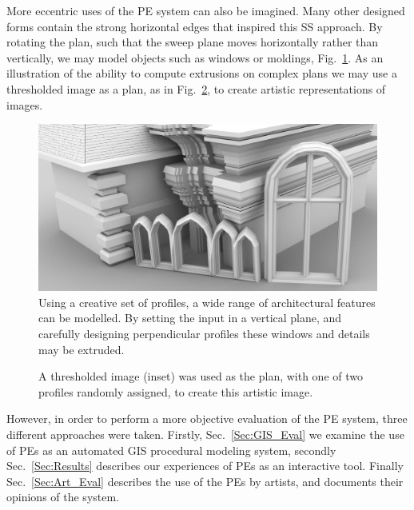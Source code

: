 More eccentric uses of the PE system can also be imagined. Many other designed forms contain the strong horizontal edges that inspired this SS approach. By rotating the plan, such that the sweep plane moves horizontally rather than vertically, we may model objects such as windows or moldings, Fig.~\ref{fig:architecture}. As an illustration of the ability to compute extrusions on complex plans we may use a thresholded image as a plan, as in Fig.~\ref{fig:wonka}, to create artistic representations of images.

\begin{figure}
  \centering
  \includegraphics[width=1.0\columnwidth]{architecture.png}
  \caption[PEs for architectural elements]{\label{fig:architecture} Using a creative set of profiles, a wide range of architectural features can be modelled. By setting the input in a vertical plane, and carefully designing perpendicular profiles these  windows and details may be extruded.}
\end{figure}

\begin{figure}
  \centering  
  \def\svgwidth{0.6\columnwidth}
  
  \caption[The PE for artistic rendering]{\label{fig:wonka}A thresholded image (inset) was used as the plan, with one of two profiles randomly assigned, to create this artistic image.}
\end{figure}

However, in order to perform a more objective evaluation of the PE system, three different approaches were taken. Firstly, Sec.~\ref{Sec:GIS_Eval} we examine the use of PEs as an automated GIS procedural modeling system, secondly Sec.~\ref{Sec:Results} describes our experiences of PEs as an interactive tool. Finally Sec.~\ref{Sec:Art_Eval} describes the use of the PEs by artists, and documents their opinions of the system.

\FloatBarrier
